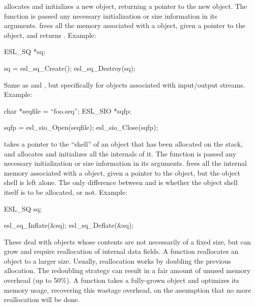 \begin{sreitems}{}
\item [\ccode{Create,Destroy}] 
   allocates and initializes a new 
  object, returning a pointer to the new
  object. The  function is passed any necessary
  initialization or size information in its arguments.
   frees all the memory associated
  with a  object,  given a pointer to the object,
  and returns . Example:

\begin{cchunk}
ESL_SQ *sq;

sq = esl_sq_Create();
esl_sq_Destroy(sq);
\end{cchunk}
  
\item [\ccode{Open,Close}] 
  Same as  and , but specifically for
  objects associated with input/output streams. Example:

\begin{cchunk}
char        *seqfile = ``foo.seq'';
ESL_SIO     *sqfp;

sqfp = esl_sio_Open(seqfile);
esl_sio_Close(sqfp);
\end{cchunk}


\item [\ccode{Inflate,Deflate}]
   takes a pointer to the ``shell'' of an
   object that has been allocated on the stack, and
  allocates and initializes all the internals of it. The
   function is passed any necessary initialization or
  size information in its arguments.  
  frees all the internal memory associated with a  object,
  given a pointer to the object, but the object shell is left alone.
  The only difference between  and
   is whether the object shell itself is to be
  allocated, or not. Example:

\begin{cchunk}
ESL_SQ  sq;

esl_sq_Inflate(&sq);
esl_sq_Deflate(&sq);
\end{cchunk}



\item [\ccode{Expand,Squeeze}]
   These deal with objects whose contents are not necessarily of a
   fixed size, but can grow and require reallocation of internal data
   fields. A function  reallocates an
    object to a larger size. Usually, reallocation
   works by doubling the previous allocation. The redoubling strategy
   can result in a fair amount of unused memory overhead (up to
   50\%). A function  takes a fully-grown
   object and optimizes its memory usage, recovering this wastage
   overhead, on the assumption that no more reallocation will be
   done.




\end{sreitems}
